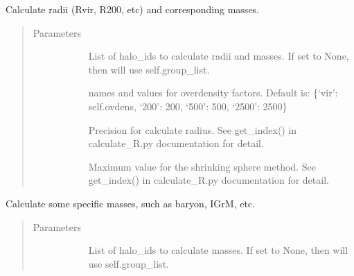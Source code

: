 \documentclass[letterpaper,10pt,english]{sphinxmanual}
\begin{document}
\begin{fulllineitems}

\begin{fulllineitems}
\label{\detokenize{halo_analysis:modules.halo_analysis.halo_props.calcu_radii_masses}}
Calculate radii (Rvir, R200, etc) and corresponding masses.
\begin{quote}\begin{description}
\item[{Parameters}] \leavevmode\begin{description}
\item[{}] \leavevmode
List of halo\_ids to calculate radii and masses. 
If set to None, then will use self.group\_list.

\item[{}] \leavevmode
names and values for overdensity factors. Default is: 
\{‘vir’: self.ovdens, ‘200’: 200, ‘500’: 500, ‘2500’: 2500\}

\item[{}] \leavevmode
Precision for calculate radius. See get\_index() in 
calculate\_R.py documentation for detail.

\item[{}] \leavevmode
Maximum value for the shrinking sphere method. See 
get\_index() in calculate\_R.py documentation for detail.

\end{description}

\end{description}\end{quote}

\end{fulllineitems}


\begin{fulllineitems}
\label{\detokenize{halo_analysis:modules.halo_analysis.halo_props.calcu_specific_masses}}
Calculate some specific masses, such as baryon, IGrM, etc.
\begin{quote}\begin{description}
\item[{Parameters}] \leavevmode\begin{description}
\item[{}] \leavevmode
List of halo\_ids to calculate masses. 
If set to None, then will use self.group\_list.


\end{description}
\end{description}
\end{quote}
\end{fulllineitems}
\end{fulllineitems}
\end{document}
